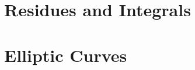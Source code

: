 \documentclass{article}
\begin{document}
\section{Residues and Integrals}

\section{Elliptic Curves}
\end{document}
